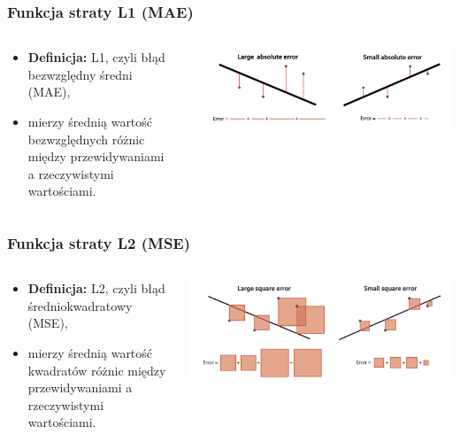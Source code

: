 \documentclass[smaller]{beamer}
\begin{document}
\begin{frame}
\frametitle{Funkcja straty L1 (MAE)}

\begin{columns}
    \begin{column}{0.4\textwidth}
        \begin{itemize}
            \item \textbf{Definicja:} L1, czyli błąd bezwzględny średni (MAE), 
            \item mierzy średnią wartość bezwzględnych różnic między przewidywaniami a rzeczywistymi wartościami.
        \end{itemize}
    \end{column}
    \begin{column}{0.6\textwidth}
        \includegraphics[width=\linewidth]{../manifest/l1.png}
    \end{column}
\end{columns}

\end{frame}


\begin{frame}
\frametitle{Funkcja straty L2 (MSE)}

\begin{columns}
    \begin{column}{0.4\textwidth}
        \begin{itemize}
            \item \textbf{Definicja:} L2, czyli błąd średniokwadratowy (MSE),
            \item mierzy średnią wartość kwadratów różnic między przewidywaniami a rzeczywistymi wartościami.
        \end{itemize}
    \end{column}
    \begin{column}{0.6\textwidth}
        \includegraphics[width=\linewidth]{../manifest/l2.png}
    \end{column}
\end{columns}

\end{frame}
\end{document}
